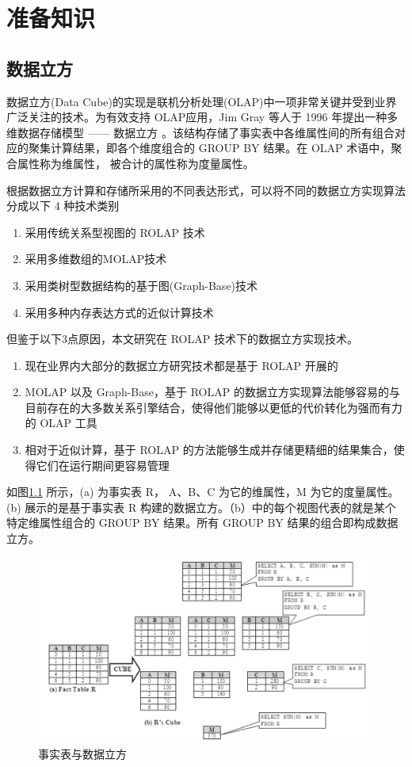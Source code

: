 \chapter{准备知识}

\section{数据立方}
数据立方(Data Cube)的实现是联机分析处理(OLAP)中一项非常关键并受到业界广泛关注的技术。为有效支持 OLAP应用，Jim Gray 等人于 1996 年提出一种多维数据存储模型 —— 数据立方 \cite{gray1997data}。该结构存储了事实表中各维属性间的所有组合对应的聚集计算结果，即各个维度组合的 GROUP BY 结果。在 OLAP 术语中，聚合属性称为维属性， 被合计的属性称为度量属性。

根据数据立方计算和存储所采用的不同表达形式，可以将不同的数据立方实现算法分成以下 4 种技术类别
\begin{enumerate}
\item 采用传统关系型视图的 ROLAP 技术 \cite{morfonios2007rolap}
\item 采用多维数组的MOLAP技术 \cite{zhao1997array}
\item 采用类树型数据结构的基于图(Graph-Base)技术 \cite{zhao2011graph}
\item 采用多种内存表达方式的近似计算技术 \cite{kamatdistributed}
\end{enumerate}

但鉴于以下3点原因，本文研究在 ROLAP 技术下的数据立方实现技术。
\begin{enumerate}
\item 现在业界内大部分的数据立方研究技术都是基于 ROLAP 开展的
\item MOLAP 以及 Graph-Base，基于 ROLAP 的数据立方实现算法能够容易的与目前存在的大多数关系引擎结合，使得他们能够以更低的代价转化为强而有力的 OLAP 工具
\item 相对于近似计算，基于 ROLAP 的方法能够生成并存储更精细的结果集合，使得它们在运行期间更容易管理
\end{enumerate}

如图\ref{fact_table_data_cube} 所示，(a) 为事实表 R， A、B、C 为它的维属性，M 为它的度量属性。(b) 展示的是基于事实表 R 构建的数据立方。（b）中的每个视图代表的就是某个特定维属性组合的 GROUP BY 结果。所有 GROUP BY 结果的组合即构成数据立方。

\begin{figure}[!htb]
\centering\includegraphics[width=6in]{picture/ch_preliminary/fact_table_data_cube} 
\caption{事实表与数据立方}\label{fact_table_data_cube} 
\end{figure} 

